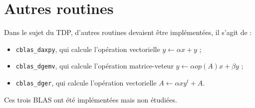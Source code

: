 \section{Autres routines}

Dans le sujet du TDP, d'autres routines devaient être implémentées, il s'agit de : 
\begin{itemize}
\item \texttt{cblas\_daxpy}, qui calcule l'opération vectorielle $y \leftarrow \alpha x + y$ ;
\item \texttt{cblas\_dgemv}, qui calcule l'opération matrice-veteur $y \leftarrow \alpha op(A)x + \beta y$ ;
\item \texttt{cblas\_dger}, qui calcule l'opération vectorielle $A \leftarrow \alpha xy^{t} + A$.
\end{itemize}

Ces trois BLAS ont été implémentées mais non étudiées.
